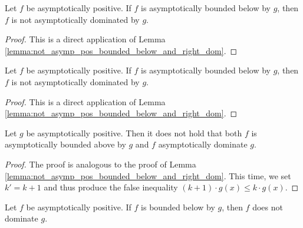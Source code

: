 \begin{theorem}
    \label{thm:not_asymp_pos_right_dom_of_bounded_below}
    \leanok
    Let $f$ be asymptotically positive. If $f$ is asymptotically bounded below by $g$, 
    then $f$ is not asymptotically dominated by $g$.
\end{theorem}

\begin{proof}
    \leanok
    This is a direct application of Lemma \ref{lemma:not_asymp_pos_bounded_below_and_right_dom}. 
\end{proof}

\begin{theorem}
    \label{thm:not_asymp_pos_bounded_below_of_right_dom}
    \leanok
    Let $f$ be asymptotically positive. If $f$ is asymptotically bounded below by $g$, 
    then $f$ is not asymptotically dominated by $g$.
\end{theorem}

\begin{proof}
    \leanok
    This is a direct application of Lemma \ref{lemma:not_asymp_pos_bounded_below_and_right_dom}. 
\end{proof}

\begin{lemma}
    \label{lemma:not_asymp_pos_bounded_above_and_left_dom}
    \leanok
    Let $g$ be asymptotically positive. Then it does not hold that both $f$ is asymptotically 
    bounded above by $g$ and $f$ asymptotically dominate $g$.
\end{lemma}

\begin{proof}
    \leanok
    The proof is analogous to the proof of Lemma 
    \ref{lemma:not_asymp_pos_bounded_below_and_right_dom}. This time, we set $k' = k + 1$
    and thus produce the false inequality $(k + 1) \cdot g(x) \le k \cdot g(x)$.
\end{proof}

\begin{theorem}
    \label{thm:not_asymp_left_dom_of_bounded_above_pos}
    \leanok
    Let $f$ be asymptotically positive. If $f$ is bounded below by $g$, then $f$ 
    does not dominate $g$.
\end{theorem}

